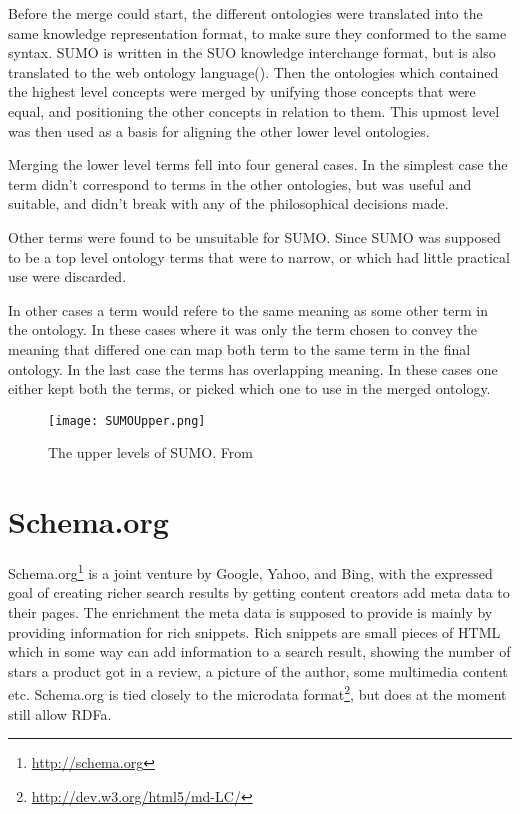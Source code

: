 Before the merge could start, the different ontologies were translated into the same knowledge representation format,
to make sure they conformed to the same syntax\citep{Niles2001}.
SUMO is written in the SUO knowledge interchange format,
but is also translated to the web ontology language()\citep{Benzmuller2012}.
Then the ontologies which contained the highest level concepts were merged by unifying those concepts that were equal,
and positioning the other concepts in relation to them.
This upmost level was then used as a basis for aligning the other lower level ontologies\citep{Niles2001}.


Merging the lower level terms fell into four general cases.
In the simplest case the term didn't correspond to terms in the other ontologies,
but was useful and suitable, and didn't break with any of the philosophical decisions made.

Other terms were found to be unsuitable for SUMO.
Since SUMO was supposed to be a top level ontology terms that were to narrow,
or which had little practical use were discarded.

In other cases a term would refere to the same meaning as some other term in the ontology.
In these cases where it was only the term chosen to convey the meaning that differed one can map both term to the same
term in the final ontology.
In the last case the terms has overlapping meaning.
In these cases one either kept both the terms, or picked which one to use in the merged ontology.

\begin{figure}[h]
    \begin{center}
        \texttt{[image: SUMOUpper.png]}
        \caption{The upper levels of SUMO. From \protect \citet{Niles2001}}
        \label{SUMOUpper}
    \end{center}
\end{figure}
\section{Schema.org}
Schema.org\footnote{\url{http://schema.org}} is a joint venture by Google, Yahoo, and Bing,
with the expressed goal of creating richer search results by getting content creators add meta data to their pages.
The enrichment the meta data is supposed to provide is mainly by providing information for rich snippets\citep{Guha2011}.
Rich snippets are small pieces of HTML which in some way can add information to a search result,
showing the number of stars a product got in a review, a picture of the author, some multimedia content etc\citep{Mayer2009}.
Schema.org is tied closely to the microdata format\footnote{\url{http://dev.w3.org/html5/md-LC/}},
but does at the moment still allow RDFa.


